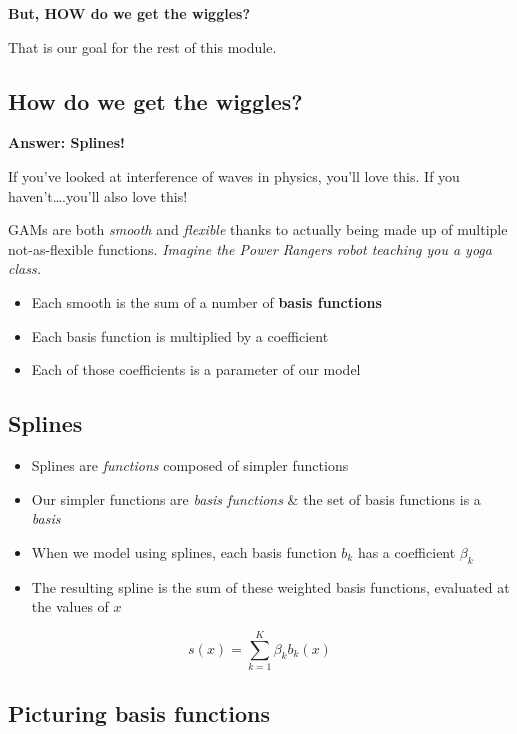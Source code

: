 \documentclass[
  openany]{book}
\providecommand{\tightlist}{%
  \setlength{\itemsep}{0pt}\setlength{\parskip}{0pt}}
\begin{document}
\textbf{But, HOW do we get the wiggles?}

That is our goal for the rest of this module.

\hypertarget{how-do-we-get-the-wiggles}{%
\subsection{How do we get the wiggles?}\label{how-do-we-get-the-wiggles}}

\textbf{Answer: Splines!}

If you've looked at interference of waves in physics, you'll love this. If you haven't\ldots.you'll also love this!

GAMs are both \emph{smooth} and \emph{flexible} thanks to actually being made up of multiple not-as-flexible functions. \emph{Imagine the Power Rangers robot teaching you a yoga class.}

\begin{itemize}
\tightlist
\item
  Each smooth is the sum of a number of \textbf{basis functions}
\item
  Each basis function is multiplied by a coefficient
\item
  Each of those coefficients is a parameter of our model
\end{itemize}

\hypertarget{splines}{%
\subsection{Splines}\label{splines}}

\begin{itemize}
\tightlist
\item
  Splines are \emph{functions} composed of simpler functions
\item
  Our simpler functions are \emph{basis functions} \& the set of basis functions is a \emph{basis}
\item
  When we model using splines, each basis function \(b_k\) has a coefficient \(\beta_k\)
\item
  The resulting spline is the sum of these weighted basis functions, evaluated at the values of \(x\)
\end{itemize}

\[s(x) = \sum_{k = 1}^K \beta_k b_k(x)\]

\hypertarget{picturing-basis-functions}{%
\subsection{Picturing basis functions}\label{picturing-basis-functions}}
\end{document}
